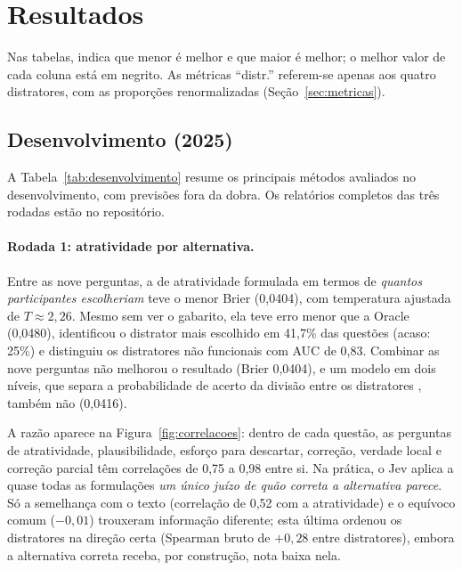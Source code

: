 
\section{Resultados}\label{sec:resultados}

Nas tabelas, \menor{} indica que menor é melhor e \maior{} que maior é melhor; o melhor valor de cada coluna está em negrito. As métricas ``distr.'' referem-se apenas aos quatro distratores, com as proporções renormalizadas (Seção~\ref{sec:metricas}).

\subsection{Desenvolvimento (2025)}\label{sec:res-desenvolvimento}

A Tabela~\ref{tab:desenvolvimento} resume os principais métodos avaliados no desenvolvimento, com previsões fora da dobra. Os relatórios completos das três rodadas estão no repositório.



\paragraph{Rodada 1: atratividade por alternativa.} Entre as nove perguntas, a de atratividade formulada em termos de \emph{quantos participantes escolheriam} teve o menor Brier (0,0404), com temperatura ajustada de $T \approx 2{,}26$. Mesmo sem ver o gabarito, ela teve erro menor que a Oracle (0,0480), identificou o distrator mais escolhido em 41,7\% das questões (acaso: 25\%) e distinguiu os distratores não funcionais com AUC de 0,83. Combinar as nove perguntas não melhorou o resultado (Brier 0,0404), e um modelo em dois níveis, que separa a probabilidade de acerto da divisão entre os distratores \citep{bolt2012}, também não (0,0416).

A razão aparece na Figura~\ref{fig:correlacoes}: dentro de cada questão, as perguntas de atratividade, plausibilidade, esforço para descartar, correção, verdade local e correção parcial têm correlações de 0,75 a 0,98 entre si. Na prática, o Jev aplica a quase todas as formulações \emph{um único juízo de quão correta a alternativa parece}. Só a semelhança com o texto (correlação de 0,52 com a atratividade) e o equívoco comum ($-0{,}01$) trouxeram informação diferente; esta última ordenou os distratores na direção certa (Spearman bruto de $+0{,}28$ entre distratores), embora a alternativa correta receba, por construção, nota baixa nela.

